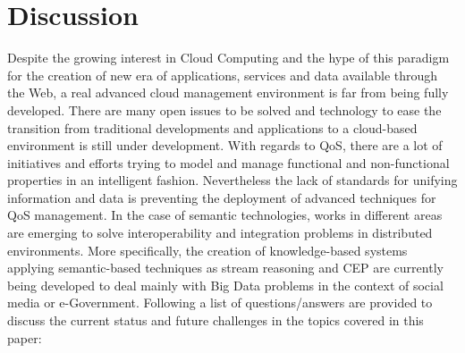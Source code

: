 \chapter{Discussion}
Despite the growing interest in Cloud Computing and the hype of this 
paradigm for the creation of new era of applications, services and data 
available through the Web, a real advanced cloud management environment is far 
from being fully developed. There are many open issues to be solved and 
technology to ease the transition from traditional developments and applications 
to a cloud-based environment is still under development. With regards to QoS, 
there are a lot of initiatives and efforts trying to model and manage functional 
and non-functional properties in an intelligent fashion. Nevertheless the lack 
of standards for unifying information and data is preventing the deployment of 
advanced techniques for QoS management. In the case of semantic technologies, 
works in different areas are emerging to solve interoperability and integration 
problems in distributed environments. More specifically, the creation of 
knowledge-based systems applying semantic-based techniques as stream reasoning 
and CEP are currently being developed to deal mainly with Big Data problems in the 
context of social media or e-Government. Following a list of questions/answers 
are provided to discuss the current status and future challenges in the 
topics covered in this paper:
